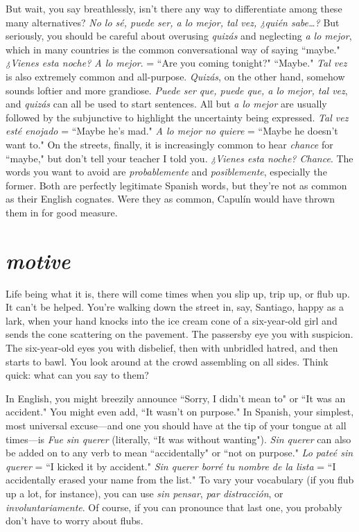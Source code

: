 But wait, you say breathlessly, isn't there any way to differentiate among these many alternatives? \emph{No lo sé, puede ser, a lo mejor, tal vez, ¿quién
sabe\ldots{}?}
But seriously, you should be careful about
overusing \emph{quizás} and neglecting \emph{a lo mejor}, which in many countries
is the common conversational way of saying ``maybe." \emph{¿Vienes esta
noche? A lo mejor}. = ``Are you coming tonight?" ``Maybe." \emph{Tal vez} is
also extremely common and all-purpose. \emph{Quizás}, on the other hand,
somehow sounds loftier and more grandiose. \emph{Puede ser que, puede
que, a lo mejor, tal vez}, and \emph{quizás} can all be used to start sentences.
All but \emph{a lo mejor} are usually followed by the subjunctive to highlight
the uncertainty being expressed. \emph{Tal vez esté enojado} = ``Maybe he's
mad." \emph{A lo mejor no quiere} = ``Maybe he doesn't want to." On the
streets, finally, it is increasingly common to hear \emph{chance} for ``maybe,"
but don't tell your teacher I told you. \emph{¿Vienes esta noche? Chance}. The
words you want to avoid are \emph{probablemente} and \emph{posiblemente}, especially the former. Both are perfectly legitimate Spanish words, but
they're not as common as their English cognates. Were they as common, Capulín would have thrown them in for good measure.

\section{\emph{motive}}

Life being what it is, there will come times when you slip up,
trip up, or flub up. It can't be helped. You're walking down the street
in, say, Santiago, happy as a lark, when your hand knocks into the ice
cream cone of a six-year-old girl and sends the cone scattering on the
pavement. The passersby eye you with suspicion. The six-year-old eyes
you with disbelief, then with unbridled hatred, and then starts to bawl.
You look around at the crowd assembling on all sides. Think quick:
what can you say to them?

In English, you might breezily announce ``Sorry, I didn't mean
to" or ``It was an accident." You might even add, ``It wasn't on purpose." In Spanish, your simplest, most universal excuse---and one you
should have at the tip of your tongue at all times---is \emph{Fue sin querer}
(literally, ``It was without wanting"). \emph{Sin querer} can also be added on
to any verb to mean ``accidentally" or ``not on purpose." \emph{Lo pateé sin
querer} = ``I kicked it by accident." \emph{Sin querer borré tu nombre de la
lista} = ``I accidentally erased your name from the list." To vary your
vocabulary (if you flub up a lot, for instance), you can use \emph{sin pensar},
\emph{par distracción}, or \emph{involuntariamente}. Of course, if you can pronounce
that last one, you probably don't have to worry about flubs.

